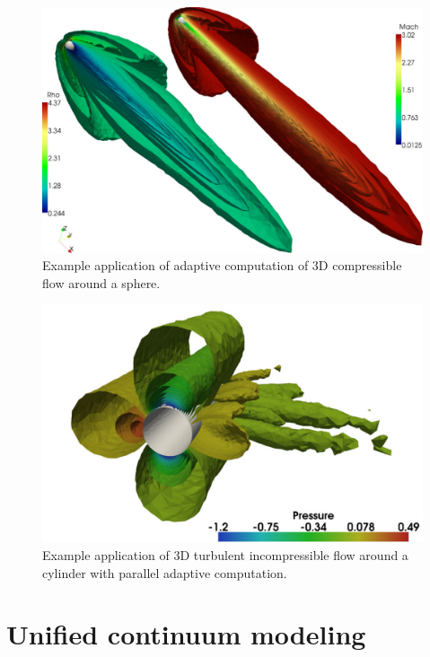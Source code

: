\begin{figure}
  \centering
  \includegraphics[width=\largefig]{chapters/hoffman-2/pdf/compressible3D.pdf}
  \caption{Example application of adaptive computation of 3D compressible
    flow around a sphere.}
  \label{fig:compr3D}
\end{figure}

\begin{figure}
  \centering
  \includegraphics[width=\largefig]{chapters/hoffman-2/pdf/Hoffman_fig3d.pdf}
  \caption{Example application of 3D turbulent incompressible flow around
    a cylinder with parallel adaptive computation.}
  \label{fig:parcyl3D}
\end{figure}

\label{chapter:implementation:unicorn}

\section{Unified continuum modeling}

